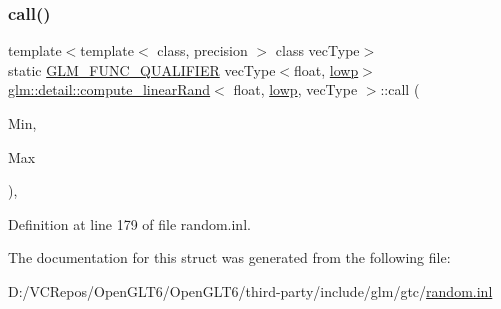 \subsubsection{\texorpdfstring{call()}{call()}}
{\footnotesize\ttfamily template$<$template$<$ class, precision $>$ class vec\+Type$>$ \\
static \mbox{\hyperlink{setup_8hpp_a33fdea6f91c5f834105f7415e2a64407}{G\+L\+M\+\_\+\+F\+U\+N\+C\+\_\+\+Q\+U\+A\+L\+I\+F\+I\+ER}} vec\+Type$<$float, \mbox{\hyperlink{namespaceglm_a0f04f086094c747d227af4425893f545ae161af3fc695e696ce3bf69f7332bc2d}{lowp}}$>$ \mbox{\hyperlink{structglm_1_1detail_1_1compute__linear_rand}{glm\+::detail\+::compute\+\_\+linear\+Rand}}$<$ float, \mbox{\hyperlink{namespaceglm_a0f04f086094c747d227af4425893f545ae161af3fc695e696ce3bf69f7332bc2d}{lowp}}, vec\+Type $>$\+::call (\begin{DoxyParamCaption}\item[{vec\+Type$<$ float, \mbox{\hyperlink{namespaceglm_a0f04f086094c747d227af4425893f545ae161af3fc695e696ce3bf69f7332bc2d}{lowp}} $>$ const \&}]{Min,  }\item[{vec\+Type$<$ float, \mbox{\hyperlink{namespaceglm_a0f04f086094c747d227af4425893f545ae161af3fc695e696ce3bf69f7332bc2d}{lowp}} $>$ const \&}]{Max }\end{DoxyParamCaption})\hspace{0.3cm}{\ttfamily [inline]}, {\ttfamily [static]}}



Definition at line 179 of file random.\+inl.



The documentation for this struct was generated from the following file\+:\begin{DoxyCompactItemize}
\item 
D\+:/\+V\+C\+Repos/\+Open\+G\+L\+T6/\+Open\+G\+L\+T6/third-\/party/include/glm/gtc/\mbox{\hyperlink{random_8inl}{random.\+inl}}\end{DoxyCompactItemize}
